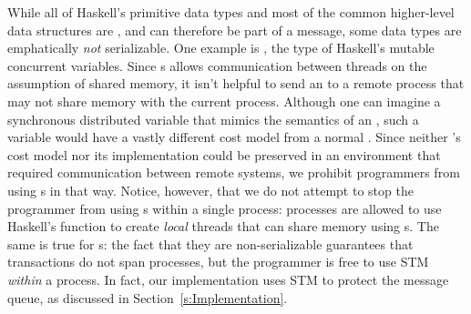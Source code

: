 \documentclass[preprint]{sigplanconf}
\begin{document}
While all of Haskell's primitive data types and most of the common higher-level data structures are , and can therefore be part of a message, some data types are emphatically \emph{not} serializable. 
One example is , the type of Haskell's mutable concurrent variables. Since s allows communication between threads on the assumption of shared memory, it isn't helpful to send an  to a remote process that may not share memory with the current process. 
Although one can imagine a synchronous distributed variable that mimics the semantics of an , such a variable would have a vastly different cost model from a normal . 
Since neither 's cost model nor its implementation could be preserved in an environment that required communication between remote systems, we  prohibit programmers from using s in that way.  
Notice, however, that we do not attempt to stop the programmer from using s within a single process: processes are allowed to use Haskell's  function to create \emph{local} threads that can share memory using s.
The same is true for s: the fact that they are non-serializable guarantees that  transactions 
do not span processes, but the programmer is free to use STM \emph{within} a process.  
In fact, our implementation uses STM to protect the message queue, as discussed in Section~\ref{s:Implementation}.



\end{document}
